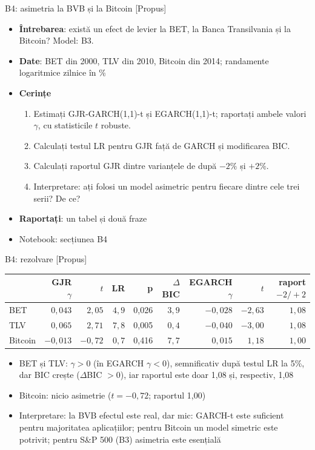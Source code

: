 \begin{frame}{B4: asimetria la BVB și la Bitcoin [Propus]}
\itemsize{\footnotesize}
\begin{itemize}
\item \textbf{Întrebarea}: există un efect de levier la BET, la Banca Transilvania și la Bitcoin? Model: B3.
\item \textbf{Date}: BET din 2000, TLV din 2010, Bitcoin din 2014; randamente logaritmice zilnice în \%
\item \textbf{Cerințe}
\begin{enumerate}
    \item Estimați GJR-GARCH(1,1)-t și EGARCH(1,1)-t; raportați ambele valori $\gamma$, cu statisticile $t$ robuste.
    \item Calculați testul LR pentru GJR față de GARCH și modificarea BIC.
    \item Calculați raportul GJR dintre varianțele de după $-2\%$ și $+2\%$.
    \item Interpretare: ați folosi un model asimetric pentru fiecare dintre cele trei serii? De ce?
\end{enumerate}
\item \textbf{Raportați}: un tabel și două fraze
\item Notebook: secțiunea B4
\end{itemize}
\end{frame}

\ifsolutions
\begin{frame}{B4: rezolvare [Propus]}
\itemsize{\footnotesize}
\begin{center}
\footnotesize
\begin{tabular}{lrrrrrrrr}
\toprule
& GJR $\gamma$ & $t$ & LR & p & $\Delta$BIC & EGARCH $\gamma$ & $t$ & raport $-2/+2$ \\
\midrule
BET & $0{,}043$ & ${2{,}05}$ & $4{,}9$ & 0{,}026 & ${3{,}9}$ & ${-0{,}028}$ & ${-2{,}63}$ & $1{,}08$ \\
TLV & $0{,}065$ & ${2{,}71}$ & $7{,}8$ & 0{,}005 & ${0{,}4}$ & ${-0{,}040}$ & ${-3{,}00}$ & $1{,}08$ \\
Bitcoin & $-0{,}013$ & ${-0{,}72}$ & $0{,}7$ & 0{,}416 & ${7{,}7}$ & ${0{,}015}$ & ${1{,}18}$ & $1{,}00$ \\
\bottomrule
\end{tabular}
\end{center}
\begin{itemize}
    \item BET și TLV: $\gamma > 0$ (în EGARCH $\gamma < 0$), semnificativ după testul LR la 5\%, dar BIC crește ($\Delta$BIC $> 0$), iar raportul este doar 1{,}08 și, respectiv, 1{,}08
    \item Bitcoin: nicio asimetrie ($t = -0{,}72$; raportul 1{,}00)
    \item Interpretare: la BVB efectul este real, dar mic: GARCH-t este suficient pentru majoritatea aplicațiilor; pentru Bitcoin un model simetric este potrivit; pentru S\&P 500 (B3) asimetria este esențială
\end{itemize}
\end{frame}
\fi

